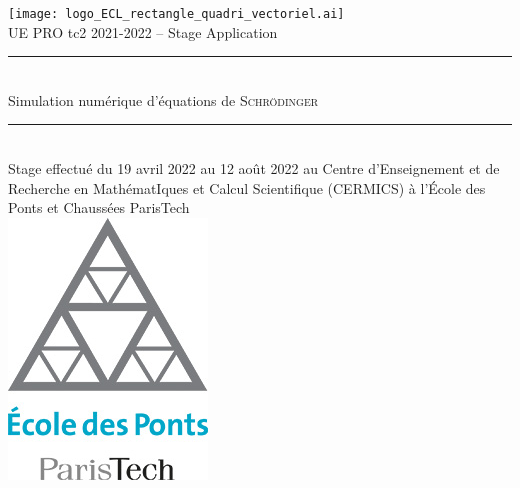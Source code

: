 \documentclass[svgnames,dvipsnames,a4paper,10pt,french]{report}
\begin{document}


\newcommand{\codewordred}[1]{\texttt{\textcolor{DarkRed}{#1}}}
\newcommand{\codewordblue}[1]{\texttt{\textcolor{blue}{#1}}}
\newcommand{\codewordgreen}[1]{\texttt{\textcolor{ForestGreen}{#1}}}
\newcommand*{\I}{\mathrm{i}}
\newcommand{\vect}[1]{\mathbf{#1}}

\newcommand{\argmax}{\operatornamewithlimits{argmax}}
\newcommand{\argmin}{\operatornamewithlimits{argmin}}
\begin{titlepage}
\begin{center}

\texttt{[image: logo\_ECL\_rectangle\_quadri\_vectoriel.ai]}\\[1cm]

{\Large UE PRO tc2 2021-2022 -- Stage Application}\\[0.5cm]



\rule{\linewidth}{0.5mm} \\[0.4cm]
{\huge  Simulation numérique d'équations de \textsc{Schrödinger}}\\[0.4cm]
\rule{\linewidth}{0.5mm} \\[1.5cm]

{\large Stage effectué du 19 avril 2022 au 12 août 2022 au Centre d’Enseignement et de Recherche en MathématIques et Calcul Scientifique (CERMICS) à l'École des Ponts et Chaussées ParisTech}\\[0.5cm]

\includegraphics[scale=.35]{5-ecole_ponts20_rvb72petit.jpg}\\[1cm]



\end{center}
\end{titlepage}
\end{document}
